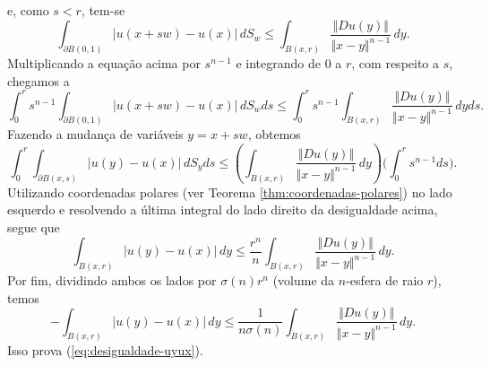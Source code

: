 \documentclass[a4paper, 11pt]{book}
\theoremstyle{definition}
\newcommand{\sint}{-\!\!\!\!\!\!\int}
\begin{document}
\begin{prf}
\[    \]
    e, como $s < r$, tem-se
    \[
        \int_{\partial B(0,1)} |u(x + sw) - u(x)|\,dS_w \leqslant   \int_{B(x,r)} \frac{\Vert Du(y) \Vert}{\Vert x - y \Vert^{n-1}} \,dy.
    \]
    Multiplicando a equação acima por $s^{n-1}$ e integrando de $0$ a $r$, com respeito a $s$, chegamos a
    \[
        \int_0^r s^{n-1} \int_{\partial B(0,1)} |u(x + sw) - u(x)| \,dS_wds \leqslant \int_0^r s^{n-1} \int_{B(x,r)} \frac{\Vert Du(y) \Vert}{\Vert x - y \Vert^{n-1}} \,dyds.
    \]
    Fazendo a mudança de variáveis $y = x + sw$, obtemos
    \[
        \int_0^r \int_{\partial B(x,s)} |u(y) - u(x)|\, dS_yds \leqslant \left( \int_{B(x,r)} \frac{\Vert Du(y) \Vert}{\Vert x - y \Vert^{n-1}} \,dy \right) \bigg( \int_0^r s^{n-1} ds \bigg).
    \]
    Utilizando coordenadas polares (ver Teorema \ref{thm:coordenadas-polares}) no lado esquerdo e resolvendo a última integral do lado direito da desigualdade acima, segue que
    \[
        \int_{B(x,r)} |u(y) - u(x)|\,dy \leqslant \frac{r^n}{n} \int_{B(x,r)} \frac{\Vert Du(y) \Vert}{\Vert x - y \Vert^{n-1}} \,dy.
    \]
    Por fim, dividindo ambos os lados por $\sigma(n) r^n$ (volume da $n$-esfera de raio $r$), temos
    \[
        \sint_{B(x,r)} |u(y) - u(x)| \,dy \leqslant \frac{1}{n\sigma(n)} \int_{B(x,r)} \frac{\Vert Du(y) \Vert}{\Vert x-y \Vert^{n-1}} \,dy.
    \]
    Isso prova (\ref{eq:desigualdade-uyux}).


\end{prf}
\end{document}
